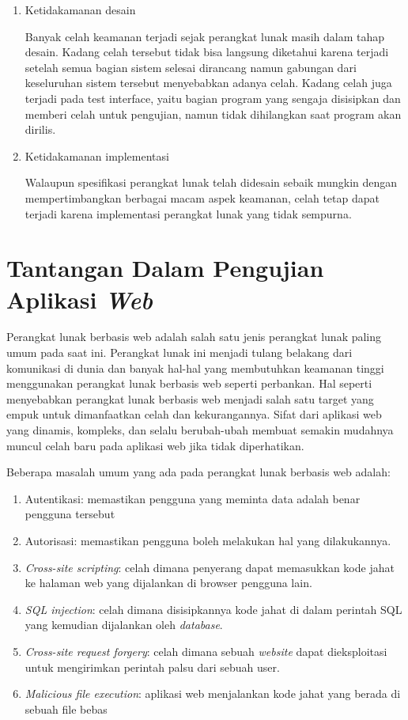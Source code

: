\begin{enumerate}
    \item Ketidakamanan desain

    Banyak celah keamanan terjadi sejak perangkat lunak masih dalam tahap desain.
    Kadang celah tersebut tidak bisa langsung diketahui karena terjadi setelah semua
    bagian sistem selesai dirancang namun gabungan dari keseluruhan sistem tersebut
    menyebabkan adanya celah.
    Kadang celah juga terjadi pada test interface, yaitu bagian program yang sengaja
    disisipkan dan memberi celah untuk pengujian, namun tidak dihilangkan saat program akan dirilis.

    \item Ketidakamanan implementasi

    Walaupun spesifikasi perangkat lunak telah didesain sebaik mungkin dengan
    mempertimbangkan berbagai macam aspek keamanan,
    celah tetap dapat terjadi karena implementasi perangkat lunak yang tidak sempurna.

\end{enumerate}

\section{Tantangan Dalam Pengujian Aplikasi \emph{Web}}

Perangkat lunak berbasis web adalah salah satu jenis perangkat lunak paling umum pada saat ini.
Perangkat lunak ini menjadi tulang belakang dari komunikasi di dunia dan banyak hal-hal
yang membutuhkan keamanan tinggi menggunakan perangkat lunak berbasis web seperti perbankan.
Hal seperti menyebabkan perangkat lunak berbasis web menjadi salah satu target yang empuk untuk
dimanfaatkan celah dan kekurangannya. Sifat dari aplikasi web yang dinamis, kompleks, dan
selalu berubah-ubah membuat semakin mudahnya muncul celah baru pada aplikasi web jika tidak diperhatikan.

Beberapa masalah umum yang ada pada perangkat lunak berbasis web adalah:
\begin{enumerate}
    \item Autentikasi: memastikan pengguna yang meminta data adalah benar pengguna tersebut
    \item Autorisasi: memastikan pengguna boleh melakukan hal yang dilakukannya.

    \item \emph{Cross-site scripting}:
    celah dimana penyerang dapat memasukkan kode jahat ke halaman web yang dijalankan di browser pengguna lain.

    \item \emph{SQL injection}:
    celah dimana disisipkannya kode jahat di dalam perintah SQL yang kemudian dijalankan oleh \emph{database}.

    \item \emph{Cross-site request forgery}:
    celah dimana sebuah \emph{website} dapat dieksploitasi untuk mengirimkan perintah palsu dari sebuah user.

    \item \emph{Malicious file execution}:
    aplikasi web menjalankan kode jahat yang berada di sebuah file bebas
\end{enumerate}

